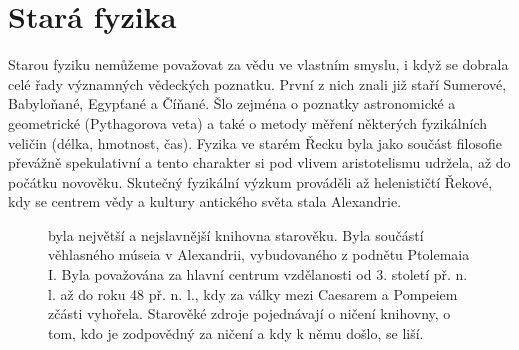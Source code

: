   \section{Stará fyzika}
    Starou fyziku nemůžeme považovat za vědu ve vlastním smyslu, i když se dobrala celé řady
    významných vědeckých poznatku. První z nich znali již staří Sumerové, Babyloňané, Egypťané a
    Číňané. Šlo zejména o  poznatky astronomické a geometrické (Pythagorova veta) a také o metody
    měření některých fyzikálních veličin (délka, hmotnost, čas). Fyzika ve starém Řecku byla jako
    součást filosofie převážně spekulativní a tento charakter si pod vlivem aristotelismu udržela,
    až do počátku novověku. Skutečný fyzikální výzkum prováděli až helenističtí Řekové, kdy se
    centrem vědy a kultury antického světa stala Alexandrie. 
    
    \begin{figure}[ht!]  %
      \centering
      \caption{ \wikiAlexLib byla největší a nejslavnější knihovna starověku. Byla součástí
                věhlasného múseia v Alexandrii, vybudovaného z podnětu Ptolemaia I. Byla považována
                za hlavní centrum vzdělanosti od 3. století př. n. l. až do roku 48 př. n. l., kdy
                za války mezi Caesarem a Pompeiem zčásti vyhořela. Starověké zdroje pojednávají o
                ničení knihovny, o tom, kdo je zodpovědný za ničení a kdy k němu došlo, se liší.
                \cite[s.~76]{Stoll2009}}
      \label{fyz:fig0894}
    \end{figure} 

